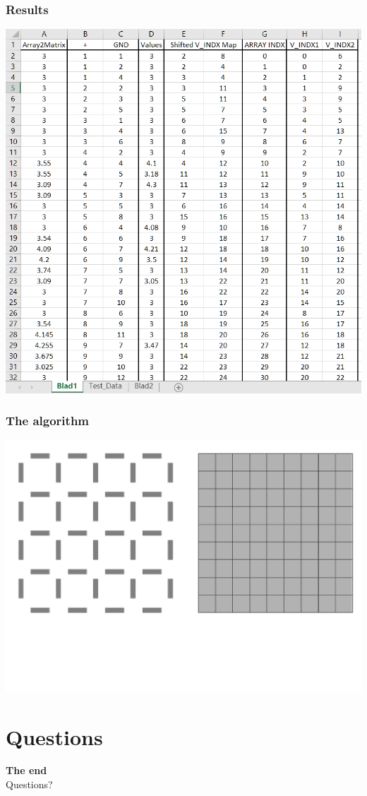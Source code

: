 \documentclass{beamer}
\begin{document}
\begin{frame}
    \frametitle{Results}
    \begin{center}
        \includegraphics[width=.8\textwidth]{img/VoltageToMatrixMap_withTestArray.PNG}
    \end{center}

\end{frame}

\begin{frame}
    \frametitle{The algorithm}
    \begin{center}
        \includegraphics[width=\textwidth]{img/grid0.png}
    \end{center}
\end{frame}

\section{Questions}%
\label{sec:qa}


\begin{frame}
    \begin{center}
        \textbf{The end}\\
        Questions?
    \end{center}
\end{frame}
\end{document}
